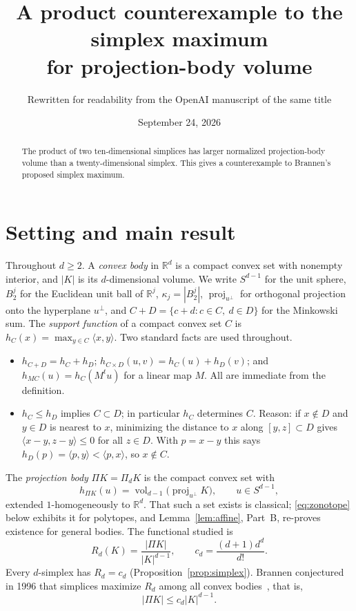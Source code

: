 \documentclass[11pt]{article}
\title{A product counterexample to the simplex maximum\\
for projection-body volume}
\author{Rewritten for readability from the OpenAI manuscript of the same title}
\date{September 24, 2026}
\newcommand{\R}{\mathbb R}
\DeclareMathOperator{\vol}{vol}
\DeclareMathOperator{\proj}{proj}
\begin{document}
\maketitle

\begin{abstract}
The product of two ten-dimensional simplices has larger normalized
projection-body volume than a twenty-dimensional simplex. This gives
a counterexample to Brannen's proposed simplex maximum.
\end{abstract}

\section{Setting and main result}

Throughout \(d\ge2\). A \emph{convex body} in \(\R^d\) is a compact convex set with nonempty interior, and \(|K|\) is its \(d\)-dimensional volume. We write \(S^{d-1}\) for the unit sphere, \(B_2^j\) for the Euclidean unit ball of \(\R^j\), \(\kappa_j=|B_2^j|\), \(\proj_{u^\perp}\) for orthogonal projection onto the hyperplane \(u^\perp\), and \(C+D=\{c+d:c\in C,\ d\in D\}\) for the Minkowski sum. The \emph{support function} of a compact convex set \(C\) is \(h_C(x)=\max_{y\in C}\langle x,y\rangle\). Two standard facts are used throughout.

\begin{itemize}
\item[(S1)] \(h_{C+D}=h_C+h_D\); \(h_{C\times D}(u,v)=h_C(u)+h_D(v)\); and \(h_{MC}(u)=h_C(M^tu)\) for a linear map \(M\). All are immediate from the definition.
\item[(S2)] \(h_C\le h_D\) implies \(C\subset D\); in particular \(h_C\) determines \(C\). Reason: if \(x\notin D\) and \(y\in D\) is nearest to \(x\), minimizing the distance to \(x\) along \([y,z]\subset D\) gives \(\langle x-y,z-y\rangle\le0\) for all \(z\in D\). With \(p=x-y\) this says \(h_D(p)=\langle p,y\rangle<\langle p,x\rangle\), so \(x\notin C\).
\end{itemize}

The \emph{projection body} \(\Pi K=\Pi_dK\) is the compact convex set with
\[
 h_{\Pi K}(u)=\vol_{d-1}\bigl(\proj_{u^\perp}K\bigr),\qquad u\in S^{d-1},
\]
extended \(1\)-homogeneously to \(\R^d\). That such a set exists is classical; \eqref{eq:zonotope} below exhibits it for polytopes, and Lemma~\ref{lem:affine}, Part~B, re-proves existence for general bodies. The functional studied is
\begin{equation}\label{eq:functional}
 R_d(K)=\frac{|\Pi K|}{|K|^{d-1}},\qquad c_d=\frac{(d+1)d^d}{d!}.
\end{equation}
Every \(d\)-simplex has \(R_d=c_d\) (Proposition~\ref{prop:simplex}). Brannen conjectured in 1996 that simplices maximize \(R_d\) among all convex bodies~\cite{Brannen}, that is,
\begin{equation}\label{eq:proposed-bound}
 |\Pi K|\le c_d|K|^{d-1}.
\end{equation}
\end{document}
